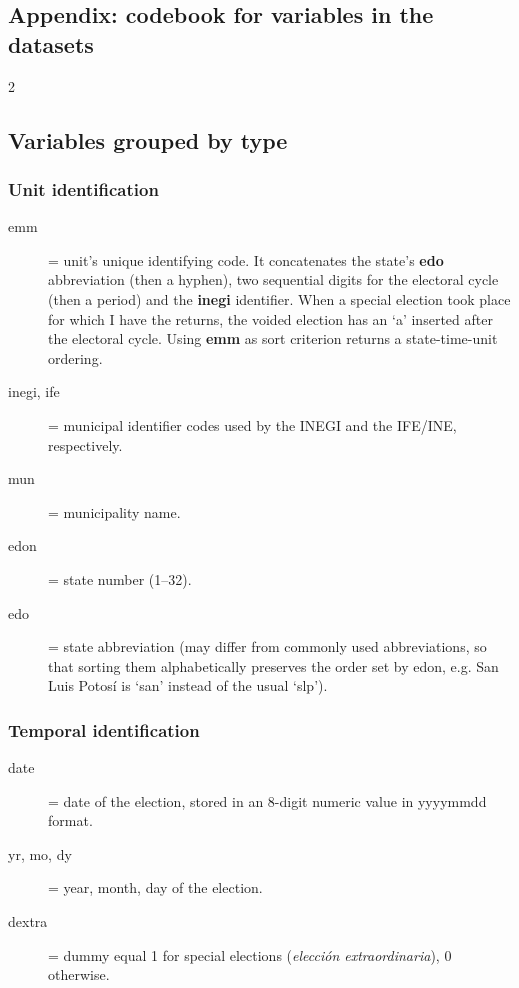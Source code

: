 \documentclass[letter,12pt]{article}
\begin{document}
\begin{singlespace}
  
\section{Appendix: codebook for variables in the datasets}

\begin{multicols}{2}
  
\begin{footnotesize}

\subsection{Variables grouped by type}
\subsubsection{Unit identification}
\begin{description}
\item[emm] = unit's unique identifying code. It concatenates the state's \textbf{edo} abbreviation (then a hyphen), two sequential digits for the electoral cycle (then a period) and the \textbf{inegi} identifier. When a special election took place for which I have the returns, the voided election has an `a' inserted after the electoral cycle. Using \textbf{emm} as sort criterion returns a state-time-unit ordering. 
\item[inegi, ife] = municipal identifier codes used by the INEGI and the IFE/INE, respectively.
\item[mun] = municipality name.
\item[edon] = state number (1--32).
\item[edo] = state abbreviation (may differ from commonly used abbreviations, so that sorting them alphabetically preserves the order set by edon, e.g. San Luis Potosí is `san' instead of the usual `slp').
\end{description}
\subsubsection{Temporal identification}
\begin{description}
\item[date] = date of the election, stored in an 8-digit numeric value in yyyymmdd format. 
\item[yr, mo, dy] = year, month, day of the election.
\item[dextra] = dummy equal 1 for special elections (\emph{elección extraordinaria}), 0 otherwise.
\end{description}

\end{footnotesize}
\end{multicols}
\end{singlespace}
\end{document}
